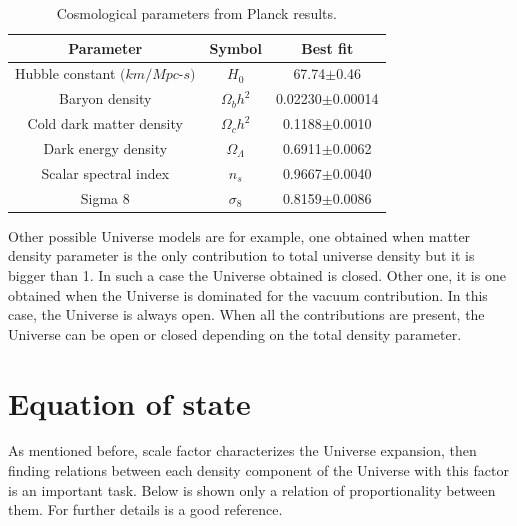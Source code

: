 \begin{table}
\begin{center}
  \begin{tabular}{ | c | c | c |}
    \hline \hline
    Parameter & Symbol & Best fit \\ \hline \hline 
    Hubble constant $(km/Mpc$-$s)$ & $H_0$ & 67.74$\pm$0.46 \\ \hline
    Baryon density & $\Omega_b h^2$ &  0.02230$\pm$0.00014 \\ \hline
    Cold dark matter density & $\Omega_c h^2$ & 0.1188$\pm$0.0010 \\  \hline
    Dark energy density & $\Omega_\Lambda$ & 0.6911$\pm$0.0062 \\ \hline
    Scalar spectral index & $n_s$ & 0.9667$\pm$0.0040 \\ \hline
    Sigma 8 & $\sigma_8$& 0.8159$\pm$0.0086 \\ \hline
  \end{tabular}
    \caption{ Cosmological parameters from Planck results\cite{planck}.}
  \label{plancktable}
\end{center}
\end{table}

Other possible Universe models are for example, one obtained when matter
density parameter is the only contribution to total universe density but 
it is bigger than 1. In such a case the Universe obtained is closed. 
Other one, it is one obtained when the Universe is dominated for the vacuum
contribution. In this case, the Universe is always open. When all the 
contributions are present, the Universe can be open or closed depending on the
total density parameter. 
		
\section{ Equation of state }

As mentioned before, scale factor characterizes the Universe expansion, 
then finding relations between each density component of the Universe 
with this factor is an important task. Below is shown only a relation of proportionality 
between them. For further details \cite{padma} is a good reference. 

\

